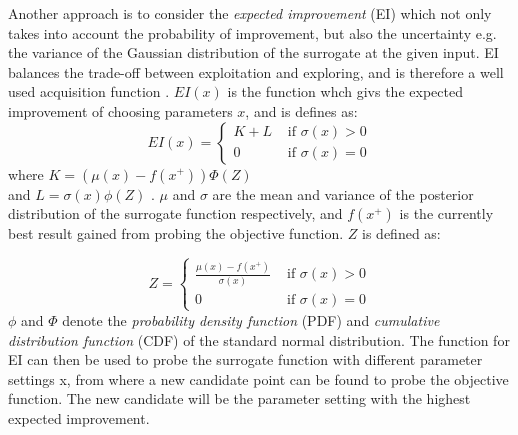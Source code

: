 Another approach is to consider the \emph{expected improvement} (EI) which not only takes into account the probability of improvement, but also the uncertainty e.g. the variance of the Gaussian distribution of the surrogate at the given input. EI balances the trade-off between exploitation and exploring, and is therefore a well used acquisition function \citet{brochu2010tutorial}. $EI(x)$ is the function whch givs the expected improvement of choosing parameters $x$, and is defines as:
\begin{equation}
\label{eq:expected-improvement}
EI(x) =
\begin{cases}
   K + L & \text{ if } \sigma(x) > 0\\
   0 	  & \text{ if } \sigma(x) = 0
\end{cases}
\end{equation}
where $K = (\mu(x) - f(x^+))\Phi(Z)$ \\and $L = \sigma(x)\phi(Z)$ .
$\mu$ and $\sigma$ are the mean and variance of the posterior distribution of the surrogate function respectively, and $f(x^+)$ is the currently best result gained from probing the objective function. $Z$ is defined as:

\begin{equation}
\label{eq:expect-z}
Z =
\begin{cases}
\frac{\mu(x) - f(x^+)}{\sigma(x)} & \text{ if } \sigma(x) > 0\\
0 								  & \text{ if } \sigma(x) = 0
\end{cases}
\end{equation}
$\phi$ and $\Phi$ denote the \emph{probability density function} (PDF) and \emph{cumulative distribution function} (CDF) of the standard normal distribution.
The function for EI can then be used to probe the surrogate function with different parameter settings x, from where a new candidate point can be found to probe the objective function. The new candidate will be the parameter setting with the highest expected improvement.  

